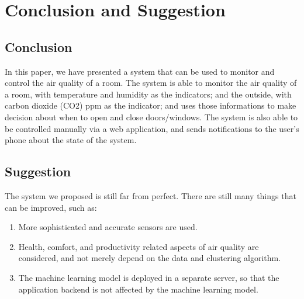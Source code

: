 \section{Conclusion and Suggestion}

\subsection{Conclusion}
In this paper, we have presented a system that can be
used to monitor and control the air quality of a room.
The system is able to monitor the air quality of a room,
with temperature and humidity as the indicators; and
the outside, with carbon dioxide (CO2) ppm as the indicator;
and uses those informations to make decision about when to
open and close doors/windows.
The system is also able to be controlled manually via a web
application, and sends notifications to the user's phone
about the state of the system.

\subsection{Suggestion}
The system we proposed is still far from perfect.
There are still many things that can be improved, such as:
\begin{enumerate}
    \item More sophisticated and accurate sensors are
          used.
    \item Health, comfort, and productivity related
          aspects of air quality are considered,
          and not merely depend on the data and
          clustering algorithm.
    \item The machine learning model is deployed
          in a separate server, so that the
          application backend is not affected
          by the machine learning model.
\end{enumerate}
